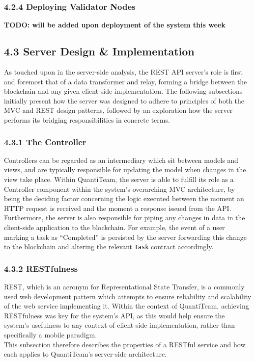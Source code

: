 \documentclass[12pt]{report}
\begin{document}
\subsubsection{4.2.4 Deploying Validator
Nodes}\label{deploying-validator-nodes}

\textbf{TODO: will be added upon deployment of the system this week}

\subsection{4.3 Server Design \&
Implementation}\label{server-design-implementation}

As touched upon in the server-side analysis, the REST API server's role
is first and foremost that of a data transformer and relay, forming a
bridge between the blockchain and any given client-side implementation.
The following subsections initially present how the server was designed
to adhere to principles of both the MVC and REST design patterns,
followed by an exploration how the server performs its bridging
responsibilities in concrete terms.

\subsubsection{4.3.1 The Controller}\label{the-controller}

Controllers can be regarded as an intermediary which sit between models
and views, and are typically responsible for updating the model when
changes in the view take
place\cite{osmani2012learning}. Within QuantiTeam, the server is able to fulfill
its role as a Controller component within the system's overarching MVC
architecture, by being the deciding factor concerning the logic executed
between the moment an HTTP request is received and the moment a response
issued from the API. Furthermore, the server is also responsible for
piping any changes in data in the client-side application to the
blockchain. For example, the event of a user marking a task as
``Completed'' is persisted by the server forwarding this change to the
blockchain and altering the relevant \texttt{Task} contract accordingly.

\subsubsection{4.3.2 RESTfulness}\label{restfulness}

REST, which is an acronym for Representational State Transfer, is a
commonly used web development pattern which attempts to ensure
reliability and scalability of the web service implementing
it\cite{1rest}. Within
the context of QuantiTeam, achieving RESTfulness was key for the
system's API, as this would help ensure the system's usefulness to any
context of client-side implementation, rather than specifically a mobile
paradigm.\\
This subsection therefore describes the properties of a RESTful service
and how each applies to QuantiTeam's server-side architecture.
\end{document}
